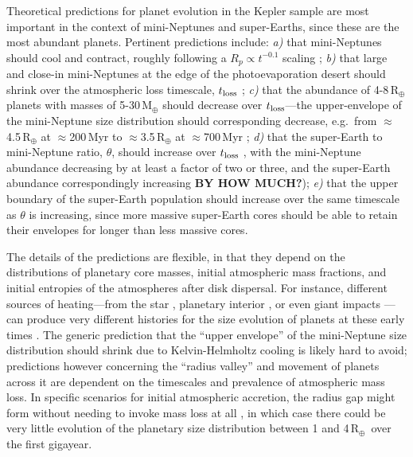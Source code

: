\documentclass[11pt,twocolumn,tighten]{aastex63}
\newcommand{\rearth}{{R$_\oplus$}}
\begin{document}
Theoretical predictions for planet evolution in the Kepler sample are
most important in the context of mini-Neptunes and super-Earths, since
these are the most abundant planets.  Pertinent predictions include:
{\it a)} that mini-Neptunes should cool and contract, roughly
following a $R_p \propto t^{-0.1}$ scaling \citep{Gupta_2019}; {\it
b)} that large and close-in mini-Neptunes at the edge of the
photoevaporation desert should shrink over the atmospheric loss
timescale, $t_{\rm loss}$ \citep{Owen_Lai_2018}; {\it c)} that the
abundance of 4-8\,R$_\oplus$ planets with masses of 5-30\,M$_\oplus$
should decrease over $t_{\rm loss}$---the upper-envelope of the
mini-Neptune size distribution should corresponding decrease,
e.g.~from $\approx$4.5\,R$_\oplus$ at $\approx$200\,Myr to
$\approx$3.5\,R$_\oplus$ at $\approx$700\,Myr
\citep[e.g.][]{Rogers_2021}; {\it d)} that the super-Earth to
mini-Neptune ratio, $\theta$, should increase over $t_{\rm loss}$
\citep[e.g.][]{Rogers_2021}, with the mini-Neptune abundance
decreasing by at least a factor of two or three, and the super-Earth
abundance correspondingly increasing {\bf BY HOW MUCH?}); {\it e)} that the
upper boundary of the super-Earth population should increase over the
same timescale as $\theta$ is increasing, since more massive
super-Earth cores should be able to retain their envelopes for longer
than less massive cores.

The details of the predictions are flexible, in that they depend on
the distributions of planetary core masses, initial atmospheric mass
fractions, and initial entropies of the atmospheres after disk
dispersal.  For instance, different sources of heating---from the star
\citep{Owen_Wu_2013,Lopez_Fortney_2014,Jin_2014}, planetary interior
\citep{Gupta_2019}, or even giant impacts
\citep{Biersteker_Schlichting_2019}---can produce very different
histories for the size evolution of planets at these early times
\citep[e.g.][]{Owen_2020}.  The generic prediction that the ``upper
envelope'' of the mini-Neptune size distribution should shrink due to
Kelvin-Helmholtz cooling is likely hard to avoid; predictions however
concerning the ``radius valley'' and movement of planets across it are
dependent on the timescales and prevalence of atmospheric mass loss.
In specific scenarios for initial atmospheric accretion, the radius
gap might form without needing to invoke mass loss at all
\citep{Lee_2022}, in which case there could be very little evolution
of the planetary size distribution between 1 and 4\,\rearth\ over the
first gigayear.
\end{document}
